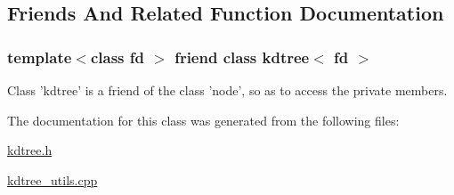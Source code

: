 \subsection{Friends And Related Function Documentation}
\hypertarget{classnode_a01262b43303642d58dcf997f191757c8}{
\subsubsection[{kdtree$<$ fd $>$}]{\setlength{\rightskip}{0pt plus 5cm}template$<$class fd $>$ friend class {\bf kdtree}$<$ fd $>$\hspace{0.3cm}{\ttfamily [friend]}}}\label{classnode_a01262b43303642d58dcf997f191757c8}
Class 'kdtree' is a friend of the class 'node', so as to access the private members. 

The documentation for this class was generated from the following files\-:\begin{DoxyCompactItemize}
\item 
\hyperlink{kdtree_8h}{kdtree.\-h}\item 
\hyperlink{kdtree__utils_8cpp}{kdtree\-\_\-utils.\-cpp}\end{DoxyCompactItemize}
